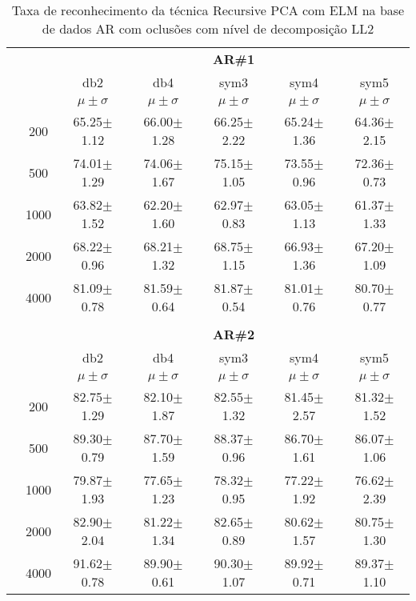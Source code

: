 \begin{table}[H]
	\centering
    \normalsize
	\caption{Taxa de reconhecimento da técnica Recursive PCA com ELM na base de dados AR com oclusões com nível de decomposição LL2}
   \hspace{0.5in}
	\begin{tabular}{|c|c|c c c c c|}
\cline{3-7}
\multicolumn{2}{c|}{\multirow{3}{*}{}} & \multicolumn{5}{c|}{\textbf{AR\#1}}   \\\cline{3-7} 
\multicolumn{2}{c|}{}  & db2 & db4 & sym3 & sym4 & sym5 \\\cline{3-7}%
\multicolumn{2}{c|}{}& $\mu \pm \sigma$ & $\mu \pm \sigma$ & $\mu \pm \sigma$ & $\mu \pm \sigma$ & $\mu \pm \sigma$ \\\hline


\multicolumn{1}{|c|}{ \multirow{5}{*}{\rotatebox[origin=c]{90}{\textbf{Neurônios}}} }
&200	&65.25$\pm$1.12	&66.00$\pm$1.28	&66.25$\pm$2.22	&65.24$\pm$1.36	&64.36$\pm$2.15\\\cline{2-7}
&500	&74.01$\pm$1.29	&74.06$\pm$1.67	&75.15$\pm$1.05	&73.55$\pm$0.96	&72.36$\pm$0.73\\\cline{2-7}
&1000	&63.82$\pm$1.52	&62.20$\pm$1.60	&62.97$\pm$0.83	&63.05$\pm$1.13	&61.37$\pm$1.33\\\cline{2-7}
&2000	&68.22$\pm$0.96	&68.21$\pm$1.32	&68.75$\pm$1.15	&66.93$\pm$1.36	&67.20$\pm$1.09\\\cline{2-7}
&4000	&81.09$\pm$0.78	&81.59$\pm$0.64	&81.87$\pm$0.54	&81.01$\pm$0.76	&80.70$\pm$0.77





\\\midrule%

\multicolumn{7}{c}{}\\ 

\cline{3-7}
\multicolumn{2}{c|}{\multirow{3}{*}{}} & \multicolumn{5}{c|}{\textbf{AR\#2}}   \\\cline{3-7} 

\multicolumn{2}{c|}{}  & db2 & db4 & sym3 & sym4 & sym5 \\\cline{3-7}
\multicolumn{2}{c|}{}& $\mu \pm \sigma$ & $\mu \pm \sigma$ & $\mu \pm \sigma$ & $\mu \pm \sigma$ & $\mu \pm \sigma$ \\\hline


\multicolumn{1}{|c|}{ \multirow{5}{*}{\rotatebox[origin=c]{90}{\textbf{Neurônios}}} }
&200	&82.75$\pm$1.29	&82.10$\pm$1.87 &82.55$\pm$1.32	&81.45$\pm$2.57	&81.32$\pm$1.52\\\cline{2-7}
&500	&89.30$\pm$0.79	&87.70$\pm$1.59	&88.37$\pm$0.96	&86.70$\pm$1.61	&86.07$\pm$1.06\\\cline{2-7}
&1000	&79.87$\pm$1.93	&77.65$\pm$1.23	&78.32$\pm$0.95	&77.22$\pm$1.92	&76.62$\pm$2.39\\\cline{2-7}
&2000	&82.90$\pm$2.04	&81.22$\pm$1.34	&82.65$\pm$0.89	&80.62$\pm$1.57	&80.75$\pm$1.30\\\cline{2-7}
&4000	&91.62$\pm$0.78	&89.90$\pm$0.61	&90.30$\pm$1.07	&89.92$\pm$0.71	&89.37$\pm$1.10





\end{tabular}
\end{table}
